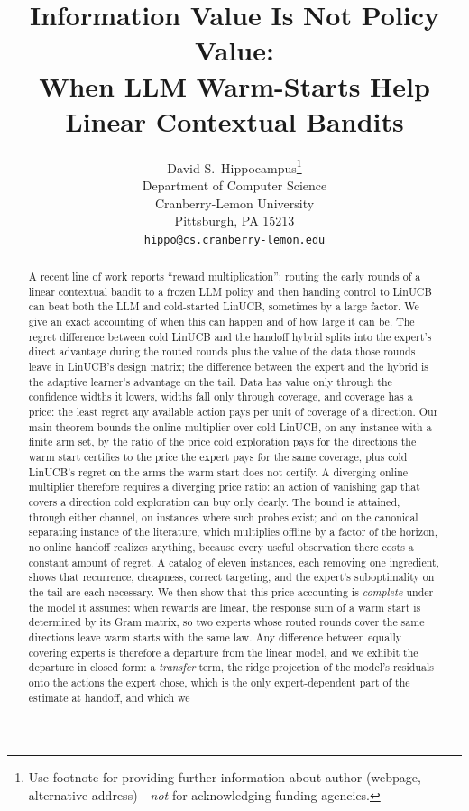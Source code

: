 \documentclass{article}
\title{Information Value Is Not Policy Value:\\ When LLM Warm-Starts Help Linear Contextual Bandits}
\author{%
  David S.~Hippocampus\thanks{Use footnote for providing further information
    about author (webpage, alternative address)---\emph{not} for acknowledging
    funding agencies.} \\
  Department of Computer Science\\
  Cranberry-Lemon University\\
  Pittsburgh, PA 15213 \\
  \texttt{hippo@cs.cranberry-lemon.edu} \\
}
\theoremstyle{definition}
\theoremstyle{remark}
\theoremstyle{remark}
\begin{document}
\maketitle
\begin{abstract}
A recent line of work reports ``reward multiplication'': routing the early
rounds of a linear contextual bandit to a frozen LLM policy and then handing
control to LinUCB can beat both the LLM and cold-started LinUCB, sometimes by a
large factor. We give an exact accounting of when this can happen and of how
large it can be. The regret difference between cold LinUCB and the handoff
hybrid splits into the expert's direct advantage during the routed rounds plus
the value of the data those rounds leave in LinUCB's design matrix; the
difference between the expert and the hybrid is the adaptive learner's
advantage on the tail. Data has value only through the confidence widths it
lowers, widths fall only through coverage, and coverage has a price: the least
regret any available action pays per unit of coverage of a direction. Our
main theorem bounds the online multiplier over cold LinUCB, on any instance
with a finite arm set, by the ratio of the price cold exploration pays for the
directions the warm start certifies to the price the expert pays for the same
coverage, plus cold LinUCB's regret on the arms the warm start does not
certify. A diverging online multiplier therefore requires a diverging price
ratio: an action of vanishing gap that covers a direction cold exploration can
buy only dearly. The bound is attained, through either channel, on instances
where such probes exist; and on the canonical separating instance of the
literature, which multiplies offline by a factor of the horizon, no online
handoff realizes anything, because every useful observation there costs a
constant amount of regret. A catalog of eleven instances, each removing one
ingredient, shows that recurrence, cheapness, correct targeting, and the
expert's suboptimality on the tail are each necessary.
We then show that this price accounting is \emph{complete} under the
model it assumes: when rewards are linear, the response sum of a warm start
is determined by its Gram matrix, so two experts whose routed rounds cover the
same directions leave warm starts with the same law. Any difference between
equally covering experts is therefore a departure from the linear model, and
we exhibit the departure in closed form: a \emph{transfer} term, the ridge
projection of the model's residuals onto the actions the expert chose, which
is the only expert-dependent part of the estimate at handoff, and which we

\end{abstract}
\end{document}
